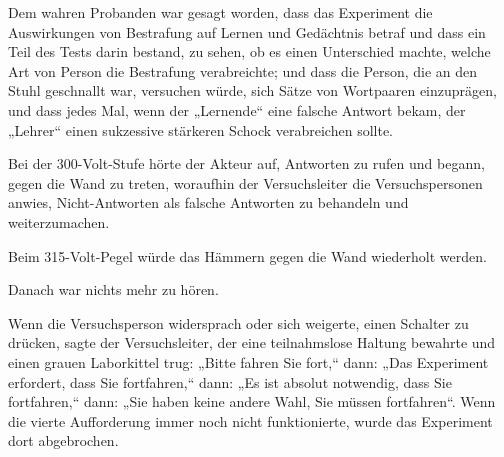 Dem wahren Probanden war gesagt worden, dass das Experiment die Auswirkungen von Bestrafung auf Lernen und Gedächtnis betraf und dass ein Teil des Tests darin bestand, zu sehen, ob es einen Unterschied machte, welche Art von Person die Bestrafung verabreichte; und dass die Person, die an den Stuhl geschnallt war, versuchen würde, sich Sätze von Wortpaaren einzuprägen, und dass jedes Mal, wenn der „Lernende“ eine falsche Antwort bekam, der „Lehrer“ einen sukzessive stärkeren Schock verabreichen sollte.

Bei der 300-Volt-Stufe hörte der Akteur auf, Antworten zu rufen und begann, gegen die Wand zu treten, woraufhin der Versuchsleiter die Versuchspersonen anwies, Nicht-Antworten als falsche Antworten zu behandeln und weiterzumachen.

Beim 315-Volt-Pegel würde das Hämmern gegen die Wand wiederholt werden.

Danach war nichts mehr zu hören.

Wenn die Versuchsperson widersprach oder sich weigerte, einen Schalter zu drücken, sagte der Versuchsleiter, der eine teilnahmslose Haltung bewahrte und einen grauen Laborkittel trug: „Bitte fahren Sie fort,“ dann: „Das Experiment erfordert, dass Sie fortfahren,“ dann: „Es ist absolut notwendig, dass Sie fortfahren,“ dann: „Sie haben keine andere Wahl, Sie müssen fortfahren“. Wenn die vierte Aufforderung immer noch nicht funktionierte, wurde das Experiment dort abgebrochen.

